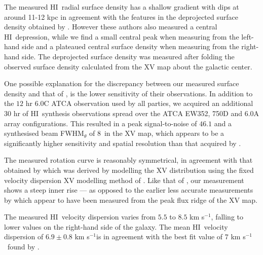 \documentclass[traditabstract]{aa} %
\newcommand\HI{H{\small I}}
\newcommand\kms{km s$^{-1}$}
\begin{document}
The measured \HI\ radial surface density has a shallow gradient with
dips at around 11-12 kpc in agreement with the features in the
deprojected surface density obtained by \citet{vdkjvkf2001}. However
these authors also measured a central \HI\ depression, while we
find a small central peak when measuring from the left-hand side and
a plateaued central surface density when measuring from the right-hand
side. The deprojected surface density was measured after folding the
observed surface density calculated from the XV map about the galactic
center.

One possible explanation for the discrepancy between our measured
surface density and that of \citet{vdkjvkf2001}, is the lower
sensitivity of their observations. In addition to the $12$ hr 6.0C
ATCA observation used by all parties, we acquired an additional $30$
hr of \HI\ synthesis observations spread over the ATCA EW352, 750D and
6.0A array configurations. This resulted in a peak
signal-to-noise of $46.1$ and a synthesised beam FWHM$_{\theta}$ of
$8$\arcsec\ in the XV map, which appears to be a significantly higher sensitivity and spatial resolution than that acquired by \citet{vdkjvkf2001}. 

The measured rotation curve is reasonably symmetrical, in
agreement with that obtained by \citet{vdkjvkf2001} which was derived
by modelling the XV distribution using the
fixed velocity dispersion XV modelling method of
\citet[][see also Sect.2.5 in paper II]{vdkruit1981}. Like that of
\citet{vdkjvkf2001}, our measurement shows a steep inner
rise --- as opposed to the earlier less accurate measurements by
\citet{abeetal1999} which appear to have been measured from the peak
flux ridge of the XV map.

The measured \HI\ velocity dispersion varies from $5.5$ to $8.5$ \kms, falling 
to lower values on the right-hand side of the galaxy. The mean \HI\ velocity 
dispersion of $6.9\pm0.8$ \kms is in agreement with the best fit value of $7$ \kms\ 
found by \citet{vdkjvkf2001}.


\end{document}
